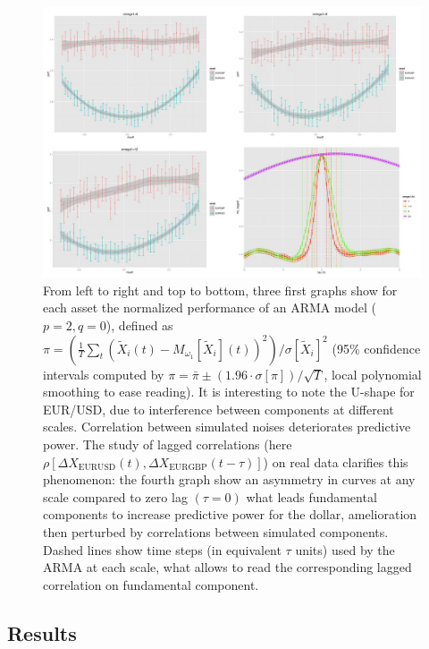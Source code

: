 \documentclass{bmcart}
\begin{document}
\begin{figure}[h!]
\includegraphics[width=\linewidth]{figures/C-syntheticdata-model_perf.jpg}
\caption{ From left to right and top to bottom, three first graphs show for each asset the normalized performance of an ARMA model ($p=2,q=0$), defined as $\pi = \left(\frac{1}{T}\sum_t\left(\tilde{X}_i(t) - M_{\omega_1}\left[\tilde{X}_i\right](t)\right)^2 \right) / \sigma \left[ \tilde{X}_i \right]^2$ (95\% confidence intervals computed by $\pi = \bar{\pi} \pm (1.96\cdot \sigma [\pi])/\sqrt{T}$, local polynomial smoothing to ease reading). It is interesting to note the U-shape for EUR/USD, due to interference between components at different scales. Correlation between simulated noises deteriorates predictive power. The study of lagged correlations (here $\rho [\Delta X_{\textrm{EURUSD}}(t),\Delta X_{\textrm{EURGBP}}(t-\tau)]$) on real data clarifies this phenomenon: the fourth graph show an asymmetry in curves at any scale compared to zero lag $(\tau = 0)$ what leads fundamental components to increase predictive power for the dollar, amelioration then perturbed by correlations between simulated components. Dashed lines show time steps (in equivalent $\tau$ units) used by the ARMA at each scale, what allows to read the corresponding lagged correlation on fundamental component.\label{fig:model_perf}}
\end{figure}



\subsection*{Results}
\end{document}
